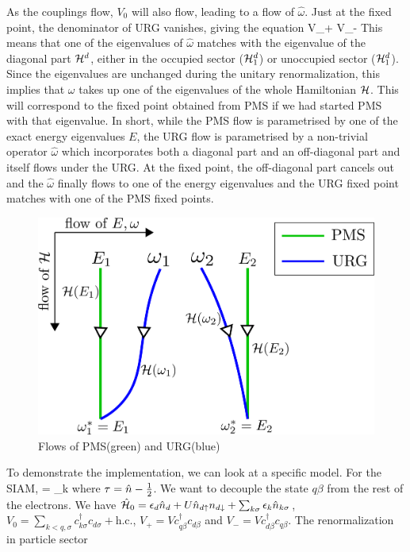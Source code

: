 \documentclass[12pt,twoside]{report}
\numberwithin{equation}{section}
\begin{document}
\pb As the couplings flow, \(V_0\) will also flow, leading to a flow of \(\hat\omega\). Just at the fixed point, the denominator of URG vanishes, giving the equation
\beq
{}V_+  V_-
\eeq
This means that one of the eigenvalues of \(\hat\omega\) matches with the eigenvalue of the diagonal part \(\mathcal{H}^d\), either in the occupied sector (\(\mathcal{H}^d_1\)) or unoccupied sector (\(\mathcal{H}^d_1\)). Since the eigenvalues are unchanged during the unitary renormalization, this implies that \(\omega\) takes up one of the eigenvalues of the whole Hamiltonian \(\mathcal{H}\). This will correspond to the fixed point obtained from PMS if we had started PMS with that eigenvalue.
\pb In short, while the PMS flow is parametrised by one of the exact energy eigenvalues \(E\), the URG flow is parametrised by a non-trivial operator \(\hat \omega\) which incorporates both a diagonal part and an off-diagonal part and itself flows under the URG. At the fixed point, the off-diagonal part cancels out and the \(\hat\omega\) finally flows to one of the energy eigenvalues and the URG fixed point matches with one of the PMS fixed points.
\begin{figure}
\centering
\includegraphics[scale=0.42]{pms_vs_urg.png}
\caption{Flows of PMS(green) and URG(blue)}
\end{figure}
\pb To demonstrate the implementation, we can look at a specific model. For the SIAM,
\beq
\ham = \sum_{k\sigma}
\eeq
where \(\tau = \hat n - \frac{1}{2}\). We want to decouple the state \(q\beta\) from the rest of the electrons. We have \(\hat{\mathcal{H}}_0 = \epsilon_d\hat n_d + U \hat n_{d\uparrow}n_{d\downarrow} + \sum_{k\sigma} \epsilon_k \hat n_{k\sigma}\), \(V_0 = \sum_{k<q,\sigma}c^\dagger_{k\sigma}c_{d\sigma}+\text{h.c.}\), \(V_+ = V c^\dagger_{q\beta}c_{d\beta}\) and \(V_- = V c^\dagger_{d\beta}c_{q\beta}\). The renormalization in particle sector
\end{document}
